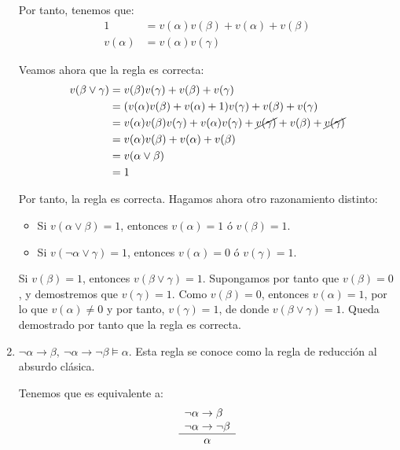 \begin{ejercicio*}
\begin{enumerate}
        Por tanto, tenemos que:
        \begin{align*}
            1 &= v(\alpha)v(\beta)+v(\alpha)+v(\beta)\\
            v(\alpha) &= v(\alpha)v(\gamma)
        \end{align*}

        Veamos ahora que la regla es correcta:
        \begin{align*}
            v(\beta\lor\gamma)
            &= v(\beta)v(\gamma)+v(\beta)+v(\gamma)\\
            &= (v(\alpha)v(\beta)+v(\alpha)+1)v(\gamma) + v(\beta) + v(\gamma)\\
            &= v(\alpha)v(\beta)v(\gamma)+v(\alpha)v(\gamma)+\cancel{v(\gamma)} + v(\beta) + \cancel{v(\gamma)}\\
            &= v(\alpha)v(\beta)+v(\alpha)+ v(\beta)\\
            &= v(\alpha\lor \beta)\\
            &= 1
        \end{align*}

        Por tanto, la regla es correcta. Hagamos ahora otro razonamiento distinto:
        \begin{itemize}
            \item Si $v(\alpha\lor\beta)=1$, entonces $v(\alpha)=1$ ó $v(\beta)=1$. 

            \item Si $v(\lnot\alpha\lor\gamma)=1$, entonces $v(\alpha)=0$ ó $v(\gamma)=1$.
        \end{itemize}
                
        Si $v(\beta)=1$, entonces $v(\beta\lor\gamma)=1$.
        Supongamos por tanto que $v(\beta)=0$, y demostremos que $v(\gamma)=1$.
        Como $v(\beta)=0$, entonces $v(\alpha)=1$, por lo que $v(\alpha)\neq 0$ y por tanto, $v(\gamma)=1$, de donde $v(\beta\lor\gamma)=1$.
        Queda demostrado por tanto que la regla es correcta.

        \item $\lnot\alpha\rightarrow\beta,~\lnot\alpha\rightarrow\lnot\beta\vDash\alpha$. Esta regla se conoce como la regla de reducción al absurdo clásica.
        
        Tenemos que es equivalente a:
        \begin{equation*}
            \begin{array}{l}
                \lnot\alpha\rightarrow\beta\\
                \lnot\alpha\rightarrow\lnot\beta\\ \hline
                \multicolumn{1}{c}{\alpha}
            \end{array}
        \end{equation*}


\end{enumerate}
\end{ejercicio*}
